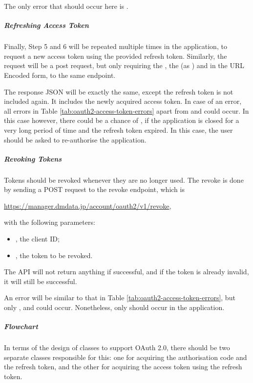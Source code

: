 The only error that should occur here is .

\subparagraph{Refreshing Access Token}

Finally, Step 5 and 6 will be repeated multiple times in the application, to request a new access token using the provided refresh token. Similarly, the request will be a post request, but only requiring the , the  (as ) and  in the URL Encoded form, to the same endpoint.

The response JSON will be exactly the same, except the refresh token is not included again. It includes the newly acquired access token. In case of an error, all errors in Table \ref{tab:oauth2-access-token-errors} apart from  and  could occur. In this case however, there could be a chance of , if the application is closed for a very long period of time and the refresh token expired. In this case, the user should be asked to re-authorise the application.

\subparagraph{Revoking Tokens}

Tokens should be revoked whenever they are no longer used. The revoke is done by sending a POST request to the revoke endpoint, which is
\begin{center}
    \url{https://manager.dmdata.jp/account/oauth2/v1/revoke},
\end{center}
with the following parameters:
\begin{itemize}
    \item {}, the client ID;
    \item {}, the token to be revoked.
\end{itemize}

The API will not return anything if successful, and if the token is already invalid, it will still be successful.

An error will be similar to that in Table \ref{tab:oauth2-access-token-errors}, but only ,  and  could occur. Nonetheless, only  should occur in the application.

\subparagraph{Flowchart}

In terms of the design of classes to support OAuth 2.0, there should be two separate classes responsible for this: one for acquiring the authorisation code and the refresh token, and the other for acquiring the access token using the refresh token.

